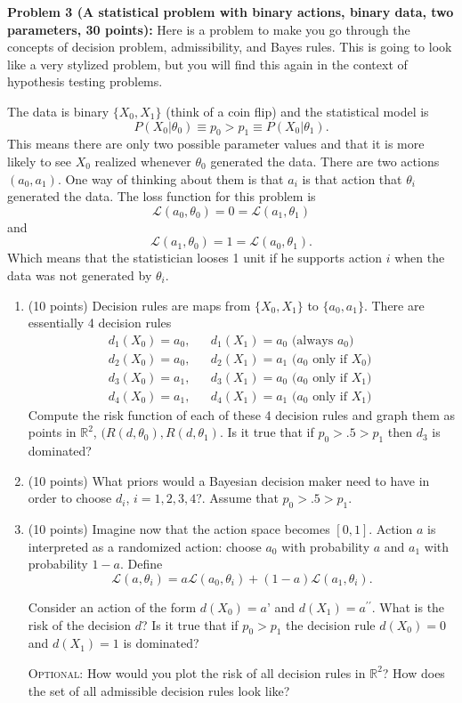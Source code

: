 \documentclass[11pt]{article} %
\begin{document}
\noindent \textbf{Problem 3 (A statistical problem with binary actions, binary data, two parameters, 30 points):} Here is a problem to make you go through the concepts of decision problem, admissibility, and Bayes rules. This is going to look like a very stylized problem, but you will find this again in the context of hypothesis testing problems. 

The data is binary $\{X_0, X_1\}$ (think of a coin flip) and the statistical model is
\[ P(X_0 | \theta_0) \equiv p_0 > p_1 \equiv P(X_0 | \theta_1 ). \]
This means there are only two possible parameter values and that it is more likely to see $X_0$ realized whenever $\theta_0$ generated the data. 
There are two actions $(a_0, a_1)$. One way of thinking about them is that $a_i$ is that action that $\theta_i$ generated the data. The loss function for this problem is 
\[ \mathcal{L}(a_0, \theta_0) = 0 = \mathcal{L}(a_1, \theta_1)    \]
and
\[ \mathcal{L}(a_1, \theta_0) = 1 = \mathcal{L}(a_0, \theta_1).    \]
Which means that the statistician looses 1 unit if he supports action $i$ when the data was not generated by $\theta_i$. 
\begin{enumerate}
\item (10 points) Decision rules are maps from $\{ X_0 , X_1 \}$ to $\{a_0, a_1\}$. There are essentially 4 decision rules 
\begin{eqnarray*}
d_1(X_0) =a_0, && d_1(X_1) = a_0 \textrm{ (always $a_0$)}\\
d_2(X_0) = a_0, && d_2(X_1) = a_1 \textrm{ ($a_0$ only if $X_0$)  }\\
d_3(X_0) = a_1, && d_3(X_1) = a_0 \textrm{ ($a_0$ only if $X_1$)  }\\
d_4(X_0) = a_1, && d_4(X_1) = a_1 \textrm{ ($a_0$ only if $X_1$)  }
\end{eqnarray*}
Compute the risk function of each of these 4 decision rules and graph them as points in $\mathbb{R}^2$, $(R(d,\theta_0), R(d,\theta_1)$. Is it true that if $p_0 > .5 > p_1$ then $d_3$ is dominated?

\item (10 points) What priors would a Bayesian decision maker need to have in order to choose $d_i$, $i=1,2,3, 4$?. Assume that $p_0 > .5 > p_1$. \\

\item (10 points) Imagine now that the action space becomes $[0,1]$. Action $a$ is interpreted as a randomized action: choose $a_0$ with probability $a$ and $a_1$ with probability $1-a$. Define
$$ \mathcal{L}(a,\theta_i) = a \mathcal{L}(a_0, \theta_i) + (1-a) \mathcal{L}(a_1,\theta_i).$$

Consider an action of the form $d(X_0) = a’$ and $d(X_1)= a^{\prime \prime}$. What is the risk of the decision $d$? Is it true that if $p_0 > p_1$ the decision rule $d(X_0) = 0$ and $d(X_1) = 1$ is dominated? 

{\scshape Optional:} How would you plot the risk of all decision rules in $\mathbb{R}^2$? How does the set of all admissible decision rules look like?

\end{enumerate}
\end{document}
